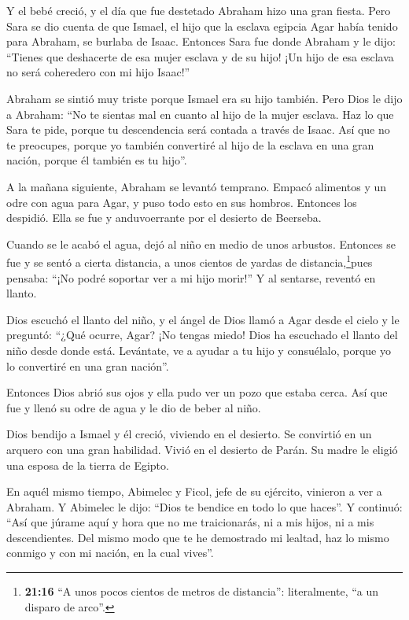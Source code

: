  Y el bebé creció, y el día que fue destetado Abraham hizo
una gran fiesta.  Pero Sara se dio cuenta de que Ismael, el
hijo que la esclava egipcia Agar había tenido para Abraham, se burlaba
de Isaac.  Entonces Sara fue donde Abraham y le dijo:
``Tienes que deshacerte de esa mujer esclava y de su hijo! ¡Un hijo de
esa esclava no será coheredero con mi hijo Isaac!''

 Abraham se sintió muy triste porque Ismael era su hijo
también.  Pero Dios le dijo a Abraham: ``No te sientas mal
en cuanto al hijo de la mujer esclava. Haz lo que Sara te pide, porque
tu descendencia será contada a través de Isaac.  Así que no
te preocupes, porque yo también convertiré al hijo de la esclava en una
gran nación, porque él también es tu hijo''.

 A la mañana siguiente, Abraham se levantó temprano. Empacó
alimentos y un odre con agua para Agar, y puso todo esto en sus hombros.
Entonces los despidió. Ella se fue y anduvoerrante por el desierto de
Beerseba.

 Cuando se le acabó el agua, dejó al niño en medio de unos
arbustos.  Entonces se fue y se sentó a cierta distancia, a
unos cientos de yardas de distancia,\footnote{\textbf{21:16} ``A unos
  pocos cientos de metros de distancia'': literalmente, ``a un disparo
  de arco''.}pues pensaba: ``¡No podré soportar ver a mi hijo morir!'' Y
al sentarse, reventó en llanto.

 Dios escuchó el llanto del niño, y el ángel de Dios llamó
a Agar desde el cielo y le preguntó: ``¿Qué ocurre, Agar? ¡No tengas
miedo! Dios ha escuchado el llanto del niño desde donde está.
 Levántate, ve a ayudar a tu hijo y consuélalo, porque yo
lo convertiré en una gran nación''.

 Entonces Dios abrió sus ojos y ella pudo ver un pozo que
estaba cerca. Así que fue y llenó su odre de agua y le dio de beber al
niño.

 Dios bendijo a Ismael y él creció, viviendo en el
desierto. Se convirtió en un arquero con una gran habilidad.
 Vivió en el desierto de Parán. Su madre le eligió una
esposa de la tierra de Egipto.

 En aquél mismo tiempo, Abimelec y Ficol, jefe de su
ejército, vinieron a ver a Abraham. Y Abimelec le dijo: ``Dios te
bendice en todo lo que haces''.  Y continuó: ``Así que
júrame aquí y hora que no me traicionarás, ni a mis hijos, ni a mis
descendientes. Del mismo modo que te he demostrado mi lealtad, haz lo
mismo conmigo y con mi nación, en la cual vives''.

